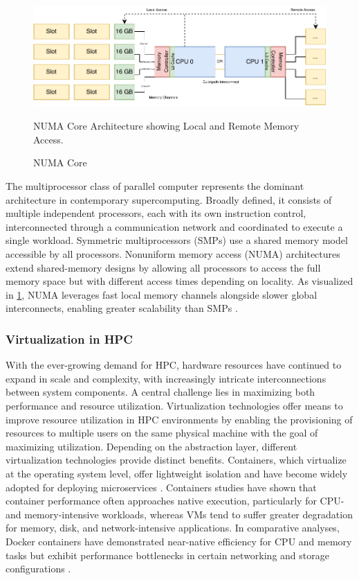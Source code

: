 \begin{figure}[H]
    \centering
    \includegraphics[scale=0.9]{fig/02/02-numa-cores.pdf}
    \caption{NUMA Core}
    \label{fig:02-numa-cores}
    \tiny
    NUMA Core Architecture showing Local and Remote Memory Access.
\end{figure}

The multiprocessor class of parallel computer represents the dominant architecture in contemporary supercomputing. Broadly defined, it consists of multiple independent processors, each with its own instruction control, interconnected through a communication network and coordinated to execute a single workload. Symmetric multiprocessors (SMPs) use a shared memory model accessible by all processors. Nonuniform memory access (NUMA) architectures extend shared-memory designs by allowing all processors to access the full memory space but with different access times depending on locality. As visualized in \ref{fig:02-numa-cores}, NUMA leverages fast local memory channels alongside slower global interconnects, enabling greater scalability than SMPs \cite{5702048} \cite{7349577}.

\subsubsection{Virtualization in HPC}
\label{sec:background_hpc_virtualization}
With the ever-growing demand for HPC, hardware resources have continued to expand in scale and complexity, with increasingly intricate interconnections between system components. A central challenge lies in maximizing both performance and resource utilization. Virtualization technologies offer means to improve resource utilization in HPC environments by enabling the provisioning of resources to multiple users on the same physical machine with the goal of maximizing utilization. Depending on the abstraction layer, different virtualization technologies provide distinct benefits. Containers, which virtualize at the operating system level, offer lightweight isolation and have become widely adopted for deploying microservices \cite{9653557}.
Containers studies have shown that container performance often approaches native execution, particularly for CPU- and memory-intensive workloads, whereas VMs tend to suffer greater degradation for memory, disk, and network-intensive applications. In comparative analyses, Docker containers have demonstrated near-native efficiency for CPU and memory tasks but exhibit performance bottlenecks in certain networking and storage configurations \cite{8397647}.

